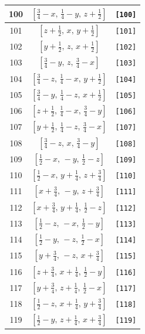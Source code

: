 \documentclass[fleqn,8pt]{jsarticle}
\begin{document}
\begin{longtable}{ccc}
100 & $\left[ \frac{3}{4} - x,\, \frac{1}{4} - y,\, z + \frac{1}{2} \right]$ & {\tt [100]} \\ \hline
101 & $\left[ z + \frac{1}{2},\, x,\, y + \frac{1}{2} \right]$ & {\tt [101]} \\ \hline
102 & $\left[ y + \frac{1}{2},\, z,\, x + \frac{1}{2} \right]$ & {\tt [102]} \\ \hline
103 & $\left[ \frac{3}{4} - y,\, z,\, \frac{3}{4} - x \right]$ & {\tt [103]} \\ \hline
104 & $\left[ \frac{3}{4} - z,\, \frac{1}{4} - x,\, y + \frac{1}{2} \right]$ & {\tt [104]} \\ \hline
105 & $\left[ \frac{3}{4} - y,\, \frac{1}{4} - z,\, x + \frac{1}{2} \right]$ & {\tt [105]} \\ \hline
106 & $\left[ z + \frac{1}{2},\, \frac{1}{4} - x,\, \frac{3}{4} - y \right]$ & {\tt [106]} \\ \hline
107 & $\left[ y + \frac{1}{2},\, \frac{1}{4} - z,\, \frac{3}{4} - x \right]$ & {\tt [107]} \\ \hline
108 & $\left[ \frac{3}{4} - z,\, x,\, \frac{3}{4} - y \right]$ & {\tt [108]} \\ \hline
109 & $\left[ \frac{1}{2} - x,\, - y,\, \frac{1}{2} - z \right]$ & {\tt [109]} \\ \hline
110 & $\left[ \frac{1}{2} - x,\, y + \frac{1}{4},\, z + \frac{3}{4} \right]$ & {\tt [110]} \\ \hline
111 & $\left[ x + \frac{3}{4},\, - y,\, z + \frac{3}{4} \right]$ & {\tt [111]} \\ \hline
112 & $\left[ x + \frac{3}{4},\, y + \frac{1}{4},\, \frac{1}{2} - z \right]$ & {\tt [112]} \\ \hline
113 & $\left[ \frac{1}{2} - z,\, - x,\, \frac{1}{2} - y \right]$ & {\tt [113]} \\ \hline
114 & $\left[ \frac{1}{2} - y,\, - z,\, \frac{1}{2} - x \right]$ & {\tt [114]} \\ \hline
115 & $\left[ y + \frac{3}{4},\, - z,\, x + \frac{3}{4} \right]$ & {\tt [115]} \\ \hline
116 & $\left[ z + \frac{3}{4},\, x + \frac{1}{4},\, \frac{1}{2} - y \right]$ & {\tt [116]} \\ \hline
117 & $\left[ y + \frac{3}{4},\, z + \frac{1}{4},\, \frac{1}{2} - x \right]$ & {\tt [117]} \\ \hline
118 & $\left[ \frac{1}{2} - z,\, x + \frac{1}{4},\, y + \frac{3}{4} \right]$ & {\tt [118]} \\ \hline
119 & $\left[ \frac{1}{2} - y,\, z + \frac{1}{4},\, x + \frac{3}{4} \right]$ & {\tt [119]} \\ \hline

\end{longtable}
\end{document}
